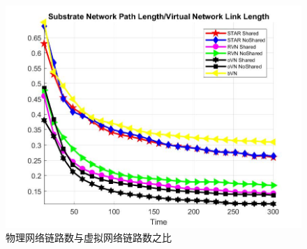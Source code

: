 \begin{frame}
\begin{figure}[htbp]
\begin{minipage}{0.4\textwidth}
\centering
\includegraphics[width=\textwidth]{figures/PathLengthSubVir2VirNet}
\caption{物理网络链路数与虚拟网络链路数之比}\label{fig:PathLengthSubVir2VirNet}
\end{minipage}\vspace{\baselineskip}
\end{figure}
\end{frame}

